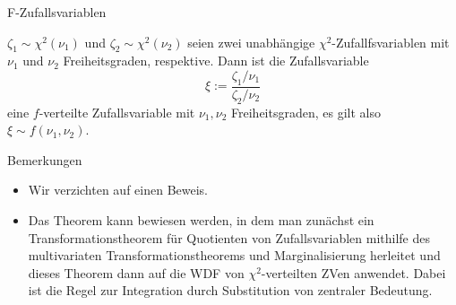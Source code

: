 \documentclass[
  8pt,
  ignorenonframetext,
]{beamer}
\providecommand{\tightlist}{%
  \setlength{\itemsep}{0pt}\setlength{\parskip}{0pt}}
\begin{document}
\begin{frame}{F-Zufallsvariablen}
\protect\hypertarget{f-zufallsvariablen-2}{}
\small
\begin{theorem}[$F$-Transformation]
\justifying
\normalfont
$\zeta_1 \sim \chi^2(\nu_1)$ und $\zeta_2 \sim \chi^2(\nu_2)$ seien zwei unabhängige
$\chi^2$-Zufallfsvariablen mit $\nu_1$ und $\nu_2$ Freiheitsgraden, respektive.
Dann ist die Zufallsvariable
\begin{equation}
\xi := \frac{\zeta_1/\nu_1}{\zeta_2/\nu_2}
\end{equation}
eine $f$-verteilte Zufallsvariable mit $\nu_1,\nu_2$ Freiheitsgraden, es gilt also $\xi \sim f(\nu_1,\nu_2)$.
\end{theorem}

\footnotesize

Bemerkungen

\begin{itemize}
\tightlist
\item
  Wir verzichten auf einen Beweis.
\item
  Das Theorem kann bewiesen werden, in dem man zunächst ein
  Transformationstheorem für Quotienten von Zufallsvariablen mithilfe
  des multivariaten Transformationstheorems und Marginalisierung
  herleitet und dieses Theorem dann auf die WDF von
  \(\chi^2\)-verteilten ZVen anwendet. Dabei ist die Regel zur
  Integration durch Substitution von zentraler Bedeutung.
\end{itemize}
\end{frame}
\end{document}

